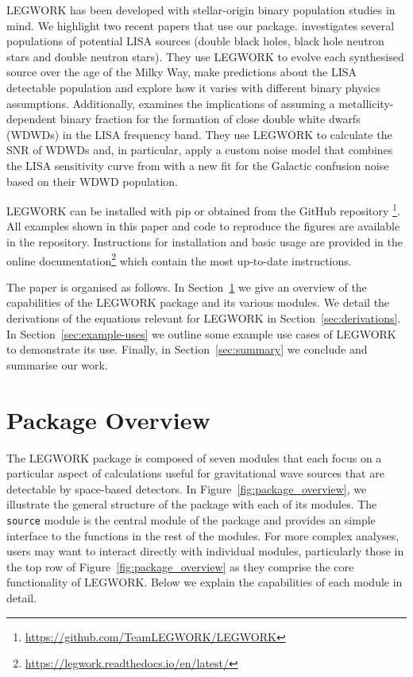\documentclass[twocolumn]{aastex631}
\newcommand{\lw}{LEGWORK}
\newcommand{\lwColour}{SeaGreen}
\begin{document}
\lw{} has been developed with stellar-origin binary population studies in mind. We highlight two recent papers that use our package. \citet{Wagg+2021} investigates several populations of potential LISA sources (double black holes, black hole neutron stars and double neutron stars). They use \lw{} to evolve each synthesised source over the age of the Milky Way, make predictions about the LISA detectable population and explore how it varies with different binary physics assumptions. Additionally, \citet{Thiele+2021} examines the implications of assuming a metallicity-dependent binary fraction for the formation of close double white dwarfs (WDWDs) in the LISA frequency band. They use \lw{} to calculate the SNR of WDWDs and, in particular, apply a custom noise model that combines the LISA sensitivity curve from \citet{Robson+2019} with a new fit for the Galactic confusion noise based on their WDWD population.

\lw{} can be installed with pip or obtained from the GitHub repository \href{https://github.com/TeamLEGWORK/LEGWORK}{\color{\lwColour}\faGithub}\footnote{\url{https://github.com/TeamLEGWORK/LEGWORK}}. All examples shown in this paper and code to reproduce the figures are available in the repository. Instructions for installation and basic usage are provided in the online documentation\footnote{\url{https://legwork.readthedocs.io/en/latest/}} which contain the most up-to-date instructions.

The paper is organised as follows. In Section~\ref{sec:LEGWORK-overview} we give an overview of the capabilities of the \lw{} package and its various modules. We detail the derivations of the equations relevant for \lw{} in Section~\ref{sec:derivations}. In Section~\ref{sec:example-uses} we outline some example use cases of \lw{} to demonstrate its use. Finally, in Section~\ref{sec:summary} we conclude and summarise our work.

\section{Package Overview}\label{sec:LEGWORK-overview}

The \lw{} package is composed of seven modules that each focus on a particular aspect of calculations useful for gravitational wave sources that are detectable by space-based detectors. In Figure~\ref{fig:package_overview}, we illustrate the general structure of the package with each of its modules. The \texttt{source} module is the central module of the package and provides an simple interface to the functions in the rest of the modules. For more complex analyses, users may want to interact directly with individual modules, particularly those in the top row of Figure~\ref{fig:package_overview} as they comprise the core functionality of \lw{}. Below we explain the capabilities of each module in detail.
\end{document}
